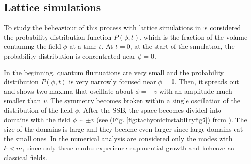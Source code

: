 \documentclass[11pt,a4paper,twoside]{book}
\begin{document}
\subsection{Lattice simulations}
To study the beheaviour of this process with lattice simulations in \cite{Chap5:TachyonicInstability} is considered the probability distribution function $ P(\phi,t) $, which is the fraction of the volume containing the field $\phi$ at a time $ t $. At $ t=0 $, at the start of the simulation, the probability distribution is concentrated near $\phi=0$.

In the beginning, quantum fluctuations are very small and the probability distribution $ P(\phi,t) $ is very narrowly focused near $\phi=0$. Then, it spreads out and shows two maxima that oscillate about $\phi = \pm v$ with an amplitude much smaller than $ v $. The symmetry becomes broken within a single oscillation of the distribution of the field $\phi$. After the SSB, the space becomes divided into domains with the field $\phi \sim \pm v$ (see (Fig. \ref{fig:tachyonicinstabilityfig3}) from \cite{Chap5:TachyonicInstability}). The size of the domains is large and they become even larger since large domains eat the small ones. In the numerical analysis  are considered only the modes with $ k < m $, since only these modes experience exponential growth and beheave as classical fields.
\end{document}
